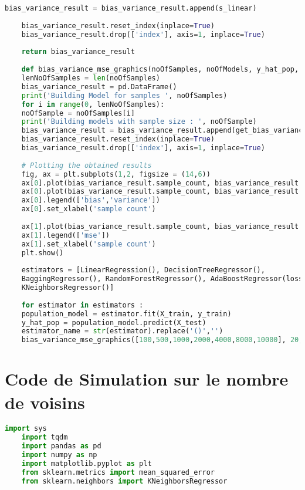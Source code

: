 \documentclass[a4paper]{article}
\begin{document}
\begin{appendices}
\begin{lstlisting}[language=Python]
	bias_variance_result = bias_variance_result.append(s_linear)
	
	bias_variance_result.reset_index(inplace=True)
	bias_variance_result.drop(['index'], axis=1, inplace=True)
	
	return bias_variance_result
	
	def bias_variance_mse_graphics(noOfSamples, noOfModels, y_hat_pop, estimator_name, estimator) :
	lenNoOfSamples = len(noOfSamples)
	bias_variance_result = pd.DataFrame()
	print('Building Model for samples ', noOfSamples)
	for i in range(0, lenNoOfSamples):
	noOfSample = noOfSamples[i]
	print('Building models with sample size : ', noOfSample)
	bias_variance_result = bias_variance_result.append(get_bias_variance(noOfSample,noOfModels, y_hat_pop, estimator_name, estimator))
	bias_variance_result.reset_index(inplace=True)
	bias_variance_result.drop(['index'], axis=1, inplace=True)
	
	# Plotting the obtained results
	fig, ax = plt.subplots(1,2, figsize = (14,6))
	ax[0].plot(bias_variance_result.sample_count, bias_variance_result.bias)
	ax[0].plot(bias_variance_result.sample_count, bias_variance_result.variance)
	ax[0].legend(['bias','variance'])
	ax[0].set_xlabel('sample count')
	
	ax[1].plot(bias_variance_result.sample_count, bias_variance_result.mse)
	ax[1].legend(['mse'])
	ax[1].set_xlabel('sample count')
	plt.show()
	
	estimators = [LinearRegression(), DecisionTreeRegressor(),
	BaggingRegressor(), RandomForestRegressor(), AdaBoostRegressor(loss='square'),
	KNeighborsRegressor()]
	
	for estimator in estimators : 
	population_model = estimator.fit(X_train, y_train)
	y_hat_pop = population_model.predict(X_test)
	estimator_name = str(estimator).replace('()','')
	bias_variance_mse_graphics([100,500,1000,2000,4000,8000,10000], 20, y_hat_pop, estimator_name, estimator)
\end{lstlisting}

\newpage

\section{Code de Simulation sur le nombre de voisins}

\begin{lstlisting}[language=Python]
	import sys
	import tqdm
	import pandas as pd
	import numpy as np
	import matplotlib.pyplot as plt
	from sklearn.metrics import mean_squared_error
	from sklearn.neighbors import KNeighborsRegressor
	

\end{lstlisting}
\end{appendices}
\end{document}
